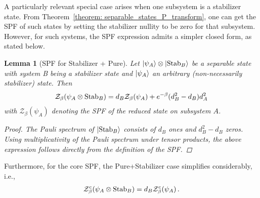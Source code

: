\documentclass[aps,pra,superscriptaddress,twocolumn,longbibliography]{revtex4-2}
\newcommand{\eqs}[1]{\begin{align}#1\end{align}}
\newtheorem{lemma}{\textbf{Lemma}}
\def\mZ{\mathcal{Z}}
\begin{document}
A particularly relevant special case arises when one subsystem is a stabilizer state. 
From Theorem~\ref{theorem: separable_states_P_transform}, one can get the SPF of such states by setting the stabilizer nullity to be zero for that subsystem. However, for such systems, the SPF expression admits a simpler closed form, as stated below.

\begin{lemma}[SPF for Stabilizer + Pure]\label{lemma:Stab+pure}
Let $\ket{\psi_{A}}\otimes \ket{{\rm Stab}_{B}}$ be a separable state with system B being a stabilizer state and $\ket{\psi_{A}}$ an arbitrary (non-necessarily stabilizer) state. Then
%
\begin{align*}
 \mathcal{Z}_{\beta}( \psi_{A}\otimes {\rm Stab}_{B})
= d_{B}\mathcal{Z}_{\beta}(\psi_{A})+e^{-\beta}(d_B^2-d_B)d_A^2
\end{align*}
%
with $\mathcal{Z}_{\beta}(\psi_{A})$ denoting the SPF of the reduced state on subsystem $A$.

\begin{proof}
    The Pauli spectrum of $\ket{{\rm Stab}_{B}}$ consists of $d_{B}$ ones and $d_{B}^{2}-d_{B}$ zeros. Using multiplicativity of the Pauli spectrum under tensor products, the above expression follows directly from the definition of the SPF.
\end{proof}
    
\end{lemma}
Furthermore, for the core SPF, the Pure+Stabilizer case simplifies considerably, i.e., \eqs{\mZ^c_{\beta}(\psi_A\otimes {\rm Stab}_B) = d_B \mZ^c_{\beta}(\psi_A)\,.}
\end{document}
